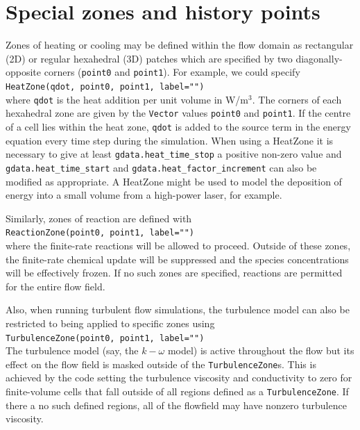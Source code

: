 \section{Special zones and history points}
\label{sec:special-zones}
% 
Zones of heating or cooling may be defined within the flow domain as rectangular (2D) 
or regular hexahedral (3D) patches which are specified by two diagonally-opposite
corners (\texttt{point0} and \texttt{point1}).
For example, we could specify\\
\texttt{HeatZone(qdot, point0, point1, label="")}\\
where \texttt{qdot} is the heat addition per unit volume in W/m$^3$.
The corners of each hexahedral zone are given by the \texttt{Vector} values 
\texttt{point0} and \texttt{point1}.
If the centre of a cell lies within the heat zone, \texttt{qdot} is added to
the source term in the energy equation every time step during the simulation. When using
a HeatZone it is necessary to give at least \texttt{gdata.heat\_time\_stop} a positive non-zero
value and \texttt{gdata.heat\_time\_start} and \texttt{gdata.heat\_factor\_increment} can also be modified
as appropriate.
A HeatZone might be used to model the deposition of energy into a small volume from 
a high-power laser, for example.

\medskip
Similarly, zones of reaction are defined with\\
\texttt{ReactionZone(point0, point1, label="")}\\
where the finite-rate reactions will be allowed to proceed.
Outside of these zones, the finite-rate chemical update will be suppressed 
and the species concentrations will be effectively frozen.
If no such zones are specified, reactions are permitted for the entire flow field.

\medskip
Also, when running turbulent flow simulations, the turbulence model can also be
restricted to being applied to specific zones using\\
\texttt{TurbulenceZone(point0, point1, label="")}\\
The turbulence model (say, the $k-\omega$ model) is active throughout the flow
but its effect on the flow field is masked outside of the \texttt{TurbulenceZone}s.
This is achieved by the code setting the turbulence viscosity and conductivity to zero
for finite-volume cells that fall outside of all regions defined as a \texttt{TurbulenceZone}.
If there a no such defined regions, all of the flowfield may have nonzero turbulence viscosity.

